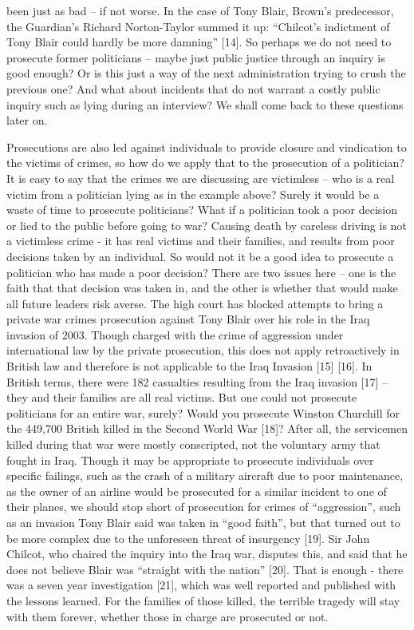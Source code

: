been just as bad – if not worse. In the case of Tony Blair, Brown’s predecessor, the Guardian’s Richard Norton-Taylor summed it up: “Chilcot's indictment of Tony Blair could hardly be more damning” [14]. So perhaps we do not need to prosecute former politicians – maybe just public justice through an inquiry is good enough? Or is this just a way of the next administration trying to crush the previous one? And what about incidents that do not warrant a costly public inquiry such as lying during an interview? We shall come back to these questions later on.

Prosecutions are also led against individuals to provide closure and vindication to the victims of crimes, so how do we apply that to the prosecution of a politician? It is easy to say that the crimes we are discussing are victimless – who is a real victim from a politician lying as in the example above? Surely it would be a waste of time to prosecute politicians? What if a politician took a poor decision or lied to the public before going to war? Causing death by careless driving is not a victimless crime - it has real victims and their families, and results from poor decisions taken by an individual. So would not it be a good idea to prosecute a politician who has made a poor decision? There are two issues here – one is the faith that that decision was taken in, and the other is whether that would make all future leaders risk averse. The high court has blocked attempts to bring a private war crimes prosecution against Tony Blair over his role in the Iraq invasion of 2003. Though charged with the crime of aggression under international law by the private prosecution, this does not apply retroactively in British law and therefore is not applicable to the Iraq Invasion [15] [16]. In British terms, there were 182 casualties resulting from the Iraq invasion [17] – they and their families are all real victims. But one could not prosecute politicians for an entire war, surely? Would you prosecute Winston Churchill for the 449,700 British killed in the Second World War [18]? After all, the servicemen killed during that war were mostly conscripted, not the voluntary army that fought in Iraq. Though it may be appropriate to prosecute individuals over specific failings, such as the crash of a military aircraft due to poor maintenance, as the owner of an airline would be prosecuted for a similar incident to one of their planes, we should stop short of prosecution for crimes of “aggression”, such as an invasion Tony Blair said was taken in “good faith”, but that turned out to be more complex due to the unforeseen threat of insurgency [19]. Sir John Chilcot, who chaired the inquiry into the Iraq war, disputes this, and said that he does not believe Blair was “straight with the nation” [20]. That is enough -  there was a seven year investigation [21], which was well reported and published with the lessons learned. For the families of those killed, the terrible tragedy will stay with them forever, whether those in charge are prosecuted or not.

